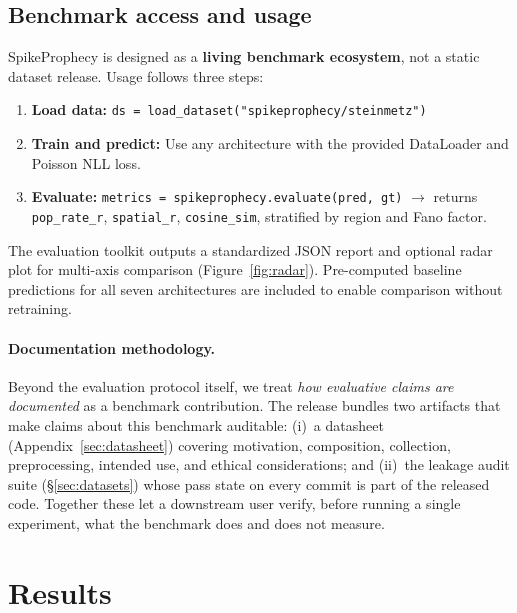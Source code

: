 \documentclass{article}
\begin{document}
\subsection{Benchmark access and usage}
\label{sec:access}

SpikeProphecy is designed as a \textbf{living benchmark ecosystem},
not a static dataset release.  Usage follows three steps:

\begin{enumerate}[nosep, leftmargin=*]
  \item \textbf{Load data:}
    \texttt{ds = load\_dataset("spikeprophecy/steinmetz")}
  \item \textbf{Train and predict:} Use any architecture with the
    provided DataLoader and Poisson NLL loss.
  \item \textbf{Evaluate:}
    \texttt{metrics = spikeprophecy.evaluate(pred, gt)}
    $\to$ returns \texttt{pop\_rate\_r}, \texttt{spatial\_r},
    \texttt{cosine\_sim}, stratified by region and Fano factor.
\end{enumerate}

\noindent The evaluation toolkit outputs a standardized JSON report
and optional radar plot for multi-axis comparison
(Figure~\ref{fig:radar}).  Pre-computed baseline predictions for all
seven architectures are included to enable comparison without
retraining.

\paragraph{Documentation methodology.}
Beyond the evaluation protocol itself, we treat \emph{how evaluative
claims are documented} as a benchmark contribution.  The release
bundles two artifacts that make claims about this benchmark
auditable: (i)~a datasheet (Appendix~\ref{sec:datasheet}) covering
motivation, composition, collection, preprocessing, intended use,
and ethical considerations; and (ii)~the leakage audit suite
(\S\ref{sec:datasets}) whose pass state on every commit is part
of the released code.  Together these
let a downstream user verify, before running a single experiment,
what the benchmark does and does not measure.

\section{Results}
\label{sec:results}
\end{document}
